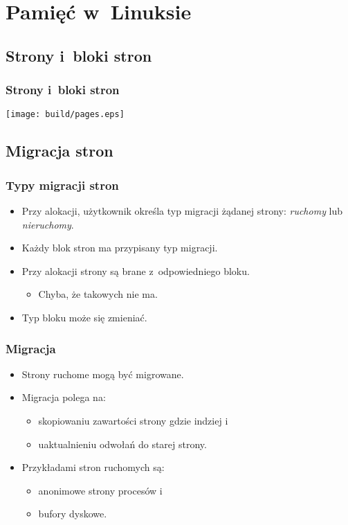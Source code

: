 \section[Linux]{Pamięć w~Linuksie}

\subsection{Strony i~bloki stron}

\begin{frame}
  \frametitle{Strony i~bloki stron}
  \begin{center}
  \texttt{[image: build/pages.eps]}
  \end{center}
\end{frame}

\subsection{Migracja stron}

\begin{frame}
  \frametitle{Typy migracji stron}

  \begin{itemize}
  \item Przy alokacji, użytkownik określa typ migracji żądanej strony:
    \textit{ruchomy} lub \textit{nieruchomy}.
  \item Każdy blok stron ma przypisany typ migracji.
  \item Przy alokacji strony są brane z~odpowiedniego bloku.
    \begin{itemize}
    \item Chyba, że takowych nie ma.
    \end{itemize}
  \item Typ bloku może się zmieniać.
  \end{itemize}
\end{frame}

\begin{frame}[fragile]
  \frametitle{Migracja}

  \begin{itemize}
  \item Strony ruchome mogą być migrowane.
  \item Migracja polega na:
    \begin{itemize}
    \item skopiowaniu zawartości strony gdzie indziej i
    \item uaktualnieniu odwołań do starej strony.
    \end{itemize}
  \item Przykładami stron ruchomych są:
    \begin{itemize}
    \item anonimowe strony procesów i
    \item bufory dyskowe.
    \end{itemize}
  \end{itemize}
\end{frame}


